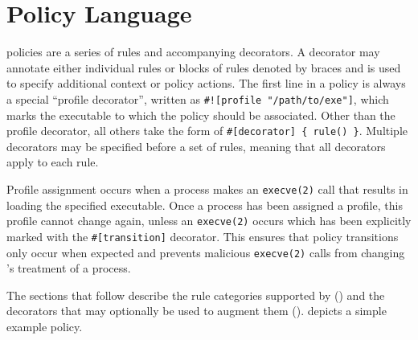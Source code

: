 \section{\bpfbox{} Policy Language}%
\label{s:bpfbox-policies}

\bpfbox{} policies are a series of rules and accompanying decorators. A decorator may
annotate either individual rules or blocks of rules denoted by braces and is used to
specify additional context or policy actions. The first line in a \bpfbox{} policy is
always a special \enquote{profile decorator}, written as
\lstinline[language=bpfbox]{#![profile "/path/to/exe"]}, which marks the executable to
which the policy should be associated.  Other than the profile decorator, all others take
the form of \lstinline[language=bpfbox]|#[decorator] { rule() }|. Multiple decorators may
be specified before a set of rules, meaning that all decorators apply to each rule.

Profile assignment occurs when a process makes an \texttt{execve(2)} call that results in
loading the specified executable.  Once a process has been assigned a profile, this
profile cannot change again, unless an \texttt{execve(2)} occurs which has been explicitly
marked with the \lstinline[language=bpfbox]{#[transition]} decorator. This ensures that
policy transitions only occur when expected and prevents malicious \texttt{execve(2)}
calls from changing \bpfbox{}'s treatment of a process.

The sections that follow describe the rule categories supported by \bpfbox{}
() and the decorators that
may optionally be used to augment them ().
 depicts a simple example \bpfbox{} policy.

